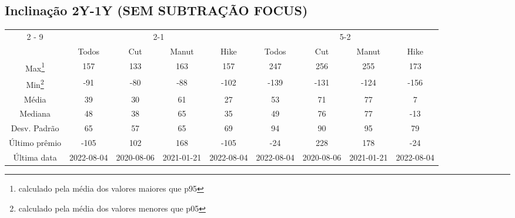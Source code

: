 \documentclass{article}%
\begin{document}
\subsection{Inclinação 2Y{-}1Y (SEM SUBTRAÇÃO FOCUS)}%
\label{subsec:Inclinao2Y{-}1Y(SEMSUBTRAOFOCUS)}%
\begin{minipage}{\textwidth}%
\vspace*{0.4in}%
\centering%
\hspace*{-0.3in}%
%
%
\begin{tabular}{c c c c c c c c c }%
\cline{2%
-%
9}%
&\multicolumn{4}{|c|}{2{-}1}&\multicolumn{4}{c|}{5{-}2}\\%
&\multicolumn{1}{|c}{Todos}&\multicolumn{1}{c}{Cut}&\multicolumn{1}{c}{Manut}&\multicolumn{1}{c|}{Hike}&\multicolumn{1}{c}{Todos}&\multicolumn{1}{c}{Cut}&\multicolumn{1}{c}{Manut}&\multicolumn{1}{c|}{Hike}\\%
\hline%
\multicolumn{1}{|c|}{Max\footnote{calculado pela média dos valores maiores que p95}}&\multicolumn{1}{c}{157}&\multicolumn{1}{c}{133}&\multicolumn{1}{c}{163}&\multicolumn{1}{c|}{157}&\multicolumn{1}{c}{247}&\multicolumn{1}{c}{256}&\multicolumn{1}{c}{255}&\multicolumn{1}{c|}{173}\\%
\hline%
\multicolumn{1}{|c|}{Min\footnote{calculado pela média dos valores menores que p05}}&\multicolumn{1}{c}{{-}91}&\multicolumn{1}{c}{{-}80}&\multicolumn{1}{c}{{-}88}&\multicolumn{1}{c|}{{-}102}&\multicolumn{1}{c}{{-}139}&\multicolumn{1}{c}{{-}131}&\multicolumn{1}{c}{{-}124}&\multicolumn{1}{c|}{{-}156}\\%
\hline%
\multicolumn{1}{|c|}{Média}&\multicolumn{1}{c}{39}&\multicolumn{1}{c}{30}&\multicolumn{1}{c}{61}&\multicolumn{1}{c|}{27}&\multicolumn{1}{c}{53}&\multicolumn{1}{c}{71}&\multicolumn{1}{c}{77}&\multicolumn{1}{c|}{7}\\%
\hline%
\multicolumn{1}{|c|}{Mediana}&\multicolumn{1}{c}{48}&\multicolumn{1}{c}{38}&\multicolumn{1}{c}{65}&\multicolumn{1}{c|}{35}&\multicolumn{1}{c}{49}&\multicolumn{1}{c}{76}&\multicolumn{1}{c}{77}&\multicolumn{1}{c|}{{-}13}\\%
\hline%
\multicolumn{1}{|c|}{Desv. Padrão}&\multicolumn{1}{c}{65}&\multicolumn{1}{c}{57}&\multicolumn{1}{c}{65}&\multicolumn{1}{c|}{69}&\multicolumn{1}{c}{94}&\multicolumn{1}{c}{90}&\multicolumn{1}{c}{95}&\multicolumn{1}{c|}{79}\\%
\hline%
\multicolumn{1}{|c|}{Último prêmio}&\multicolumn{1}{c}{{-}105}&\multicolumn{1}{c}{102}&\multicolumn{1}{c}{168}&\multicolumn{1}{c|}{{-}105}&\multicolumn{1}{c}{{-}24}&\multicolumn{1}{c}{228}&\multicolumn{1}{c}{178}&\multicolumn{1}{c|}{{-}24}\\%
\hline%
\multicolumn{1}{|c|}{Última data}&\multicolumn{1}{c}{2022{-}08{-}04}&\multicolumn{1}{c}{2020{-}08{-}06}&\multicolumn{1}{c}{2021{-}01{-}21}&\multicolumn{1}{c|}{2022{-}08{-}04}&\multicolumn{1}{c}{2022{-}08{-}04}&\multicolumn{1}{c}{2020{-}08{-}06}&\multicolumn{1}{c}{2021{-}01{-}21}&\multicolumn{1}{c|}{2022{-}08{-}04}\\%
\hline%
\end{tabular}%



\end{minipage}
\end{document}
